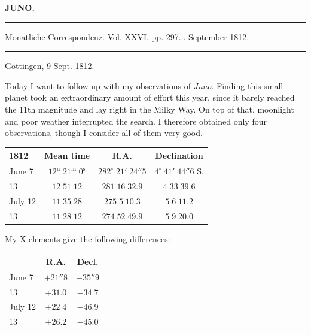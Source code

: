 \clearpage{}\hypertarget{native-365-lower}{}\label{native-365-lower}
\begin{center}\textbf{JUNO.}\par\vspace{4pt}\hrule\vspace{4pt}\fontsize{10}{12}\selectfont Monatliche Correspondenz. Vol. XXVI. pp. 297\;... September 1812.\par\vspace{4pt}\hrule\vspace{4pt}\end{center}

\begin{flushright}Göttingen, 9 Sept. 1812.\end{flushright}
\par\indent Today I want to follow up with my observations of \emph{Juno}. Finding this small planet took an extraordinary amount of effort this year, since it barely reached the 11th magnitude and lay right in the Milky Way. On top of that, moonlight and poor weather interrupted the search. I therefore obtained only four observations, though I consider all of them very good.

\begin{center}\fontsize{10}{12}\selectfont\setlength{\tabcolsep}{4pt}\renewcommand{\arraystretch}{1.15}\begin{tabular}{l|c|c|c}
1812 & Mean time & R.A. & Declination\\\hline
June 7 & $12^{\mathrm u}\;21^{\mathrm m}\;0^{\mathrm s}$ & $282^\circ\;21'\;24''5$ & $4^\circ\;41'\;44''6$ S.\\
13 & $12\;51\;12$ & $281\;16\;32.9$ & $4\;33\;39.6$\\
July 12 & $11\;35\;28$ & $275\;5\;10.3$ & $5\;6\;11.2$\\
13 & $11\;28\;12$ & $274\;52\;49.9$ & $5\;9\;20.0$\\
\end{tabular}\end{center}

\par\indent My X elements give the following differences:

\begin{center}\fontsize{10}{12}\selectfont\setlength{\tabcolsep}{7pt}\renewcommand{\arraystretch}{1.15}\begin{tabular}{l|c|c}
& R.A. & Decl.\\\hline
June 7 & $+21''8$ & $-35''9$\\
13 & $+31.0$ & $-34.7$\\
July 12 & $+22\;4$ & $-46.9$\\
13 & $+26.2$ & $-45.0$\\
\end{tabular}\end{center}

